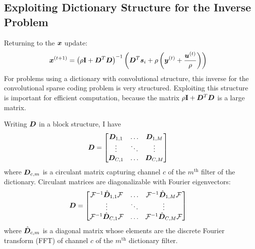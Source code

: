 \subsection{Exploiting Dictionary Structure for the Inverse Problem}
\label{subsection:SC xupdate}
Returning to the $\bm{x}$ update:
\begin{equation}
\bm{x}^{(t + 1)} = \left(\rho{\bf I} + \bm{D}^T\bm{D}\right)^{-1}\left(\bm{D}^T\bm{s}_i + \rho\left(\bm{y}^{(t)} + \frac{\bm{u}^{(t)}}{\rho}\right)\right)
\end{equation}
%
For problems using a dictionary with convolutional structure, this inverse for the convolutional sparse coding problem is very structured. Exploiting this structure is important for efficient computation, because the matrix $\rho{\bf I} + \bm{D}^T\bm{D}$ is a large matrix.

Writing $\bm{D}$ in a block structure, I have
%
\begin{equation}
\bm{D} = \begin{bmatrix}
\bm{D}_{1,1} & \hdots & \bm{D}_{1,M}\\
\vdots & \ddots & \vdots\\
\bm{D}_{C,1} & \hdots & \bm{D}_{C,M}
\end{bmatrix}
\end{equation}
%
where $\bm{D}_{c,m}$ is a circulant matrix capturing channel $c$ of the $m^{\text{th}}$ filter of the dictionary. Circulant matrices are diagonalizable with Fourier eigenvectors:
%
\begin{equation}
\bm{D} = \begin{bmatrix}
\mathcal{F}^{-1}\hat{\bm{D}}_{1,1}\mathcal{F} & \hdots & \mathcal{F}^{-1}\hat{\bm{D}}_{1,M}\mathcal{F}\\
\vdots & \ddots & \vdots\\
\mathcal{F}^{-1}\hat{\bm{D}}_{C,1}\mathcal{F} & \hdots & \mathcal{F}^{-1}\hat{\bm{D}}_{C,M}\mathcal{F}
\end{bmatrix}
\end{equation}
%
where $\hat{\bm{D}}_{c,m}$ is a diagonal matrix whose elements are the discrete Fourier transform (FFT) of channel $c$ of the $m^{\text{th}}$ dictionary filter.

